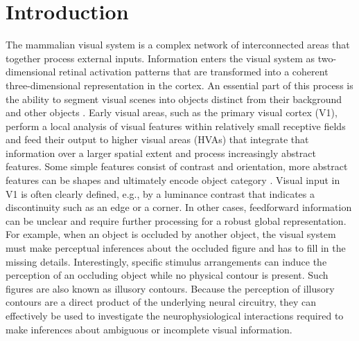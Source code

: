 \documentclass[12pt]{article}
\begin{document}
\section*{Introduction}
\setlength{\parindent}{24pt}
The mammalian visual system is a complex network of interconnected areas that together process external inputs. Information enters the visual system as two-dimensional retinal activation patterns that are transformed into a coherent three-dimensional representation in the cortex. An essential part of this process is the ability to segment visual scenes into objects distinct from their background and other objects \autocite{kirchbergerEssentialRoleFeedback2020}. Early visual areas, such as the primary visual cortex (V1), perform a local analysis of visual features within relatively small receptive fields and feed their output to higher visual areas (HVAs) that integrate that information over a larger spatial extent and process increasingly abstract features. Some simple features consist of contrast and orientation, more abstract features can be shapes and ultimately encode object category \autocite{ashbridgeEffectImageOrientation2000}. Visual input in V1 is often clearly defined, e.g., by a luminance contrast that indicates a discontinuity such as an edge or a corner. In other cases, feedforward information can be unclear and require further processing for a robust global representation. For example, when an object is occluded by another object, the visual system must make perceptual inferences about the occluded figure and has to fill in the missing details. Interestingly, specific stimulus arrangements can induce the perception of an occluding object while no physical contour is present. Such figures are also known as illusory contours. Because the perception of illusory contours are a direct product of the underlying neural circuitry, they can effectively be used to investigate the neurophysiological interactions required to make inferences about ambiguous or incomplete visual information.
\setlength{\parindent}{0pt}
\bigbreak
\end{document}
